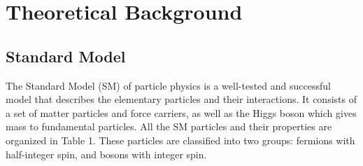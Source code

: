\documentclass[thesis.tex]{subfiles}
\begin{document}
\chapter{Theoretical Background}

\section{Standard Model}
The Standard Model (SM) of particle physics is a well-tested and successful model that describes the elementary particles and their interactions. 
It consists of a set of matter particles and force carriers, as well as the Higgs boson which gives mass to fundamental particles. 
All the SM particles and their properties are organized in Table 1. 
These particles are classified into two groups: fermions with half-integer spin, and bosons with integer spin.
\end{document}
